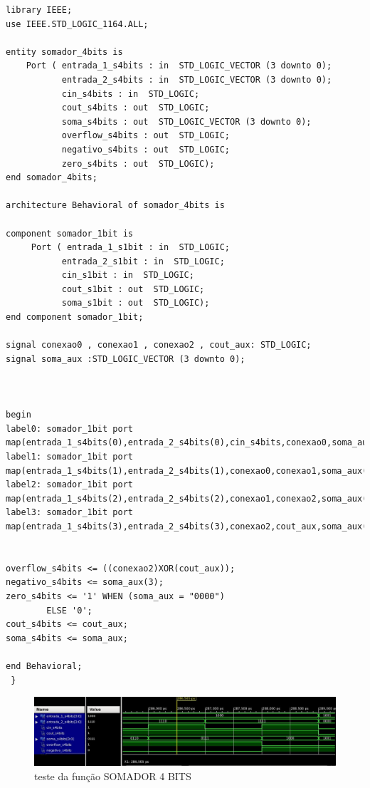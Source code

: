 \documentclass[a4paper,12pt,twoside]{article}
\begin{document}
\begin{lstlisting}
library IEEE;
use IEEE.STD_LOGIC_1164.ALL;

entity somador_4bits is
    Port ( entrada_1_s4bits : in  STD_LOGIC_VECTOR (3 downto 0);
           entrada_2_s4bits : in  STD_LOGIC_VECTOR (3 downto 0);
           cin_s4bits : in  STD_LOGIC;
           cout_s4bits : out  STD_LOGIC;
           soma_s4bits : out  STD_LOGIC_VECTOR (3 downto 0);
           overflow_s4bits : out  STD_LOGIC;
           negativo_s4bits : out  STD_LOGIC;
           zero_s4bits : out  STD_LOGIC);
end somador_4bits;

architecture Behavioral of somador_4bits is

component somador_1bit is
     Port ( entrada_1_s1bit : in  STD_LOGIC;
           entrada_2_s1bit : in  STD_LOGIC;
           cin_s1bit : in  STD_LOGIC;
           cout_s1bit : out  STD_LOGIC;
           soma_s1bit : out  STD_LOGIC);
end component somador_1bit;

signal conexao0 , conexao1 , conexao2 , cout_aux: STD_LOGIC;
signal soma_aux	:STD_LOGIC_VECTOR (3 downto 0);



begin
label0: somador_1bit port map(entrada_1_s4bits(0),entrada_2_s4bits(0),cin_s4bits,conexao0,soma_aux(0));
label1: somador_1bit port map(entrada_1_s4bits(1),entrada_2_s4bits(1),conexao0,conexao1,soma_aux(1));
label2: somador_1bit port map(entrada_1_s4bits(2),entrada_2_s4bits(2),conexao1,conexao2,soma_aux(2));
label3: somador_1bit port map(entrada_1_s4bits(3),entrada_2_s4bits(3),conexao2,cout_aux,soma_aux(3));


overflow_s4bits <= ((conexao2)XOR(cout_aux));
negativo_s4bits <= soma_aux(3);
zero_s4bits <= '1' WHEN (soma_aux = "0000")
		ELSE '0';
cout_s4bits <= cout_aux;
soma_s4bits <= soma_aux;

end Behavioral;
 } \end{lstlisting}
 
   \begin{figure}[H]
\centering
\includegraphics[scale=0.6]{testes/somador2.jpeg}
\caption{teste da função SOMADOR 4 BITS}
\label{fig:diagrama}
\end{figure}
 
\end{document}
